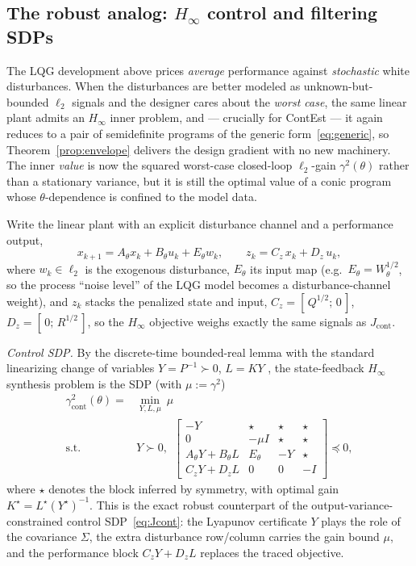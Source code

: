 \documentclass[twocolumn,amsthm]{autart}
\begin{document}
\subsection{The robust analog: $H_\infty$ control and filtering SDPs}
\label{sec:hinf}

The LQG development above prices \emph{average} performance against
\emph{stochastic} white disturbances. When the disturbances are better modeled as
unknown-but-bounded $\ell_2$ signals and the designer cares about the
\emph{worst case}, the same linear plant admits an $H_\infty$ inner problem, and
--- crucially for ContEst --- it again reduces to a pair of semidefinite programs
of the generic form~\eqref{eq:generic}, so Theorem~\ref{prop:envelope} delivers
the design gradient with no new machinery. The inner \emph{value} is now the
squared worst-case closed-loop $\ell_2$-gain $\gamma^2(\theta)$ rather than a
stationary variance, but it is still the optimal value of a conic program whose
$\theta$-dependence is confined to the model data.

Write the linear plant with an explicit disturbance channel and a performance
output,
\begin{equation}\label{eq:hinf_plant}
x_{k+1} = A_\theta x_k + B_\theta u_k + E_\theta w_k,\qquad
z_k = C_{z}\,x_k + D_{z}\,u_k,
\end{equation}
where $w_k\in\ell_2$ is the exogenous disturbance, $E_\theta$ its input map
(e.g.\ $E_\theta = W_\theta^{1/2}$, so the process ``noise level'' of the LQG model
becomes a disturbance-channel weight), and $z_k$ stacks the penalized
state and input, $C_z = [\,Q^{1/2};\,0\,]$, $D_z = [\,0;\,R^{1/2}\,]$, so the
$H_\infty$ objective weighs exactly the same signals as $J_{\mathrm{cont}}$.

\emph{Control SDP.} By the discrete-time bounded-real lemma with the standard
linearizing change of variables $Y = P^{-1}\succ 0$, $L = KY$
\cite{boyd1994linear,grigoriadis1998integrate}, the state-feedback $H_\infty$
synthesis problem is the SDP (with $\mu := \gamma^2$)
\begin{equation}\label{eq:Hinf_cont}
\begin{aligned}
\gamma^2_{\mathrm{cont}}(\theta) = &\min_{Y,L,\mu}\ \mu \\
\text{s.t. } & Y \succ 0,\ \
\begin{bmatrix}
-Y & \star & \star & \star \\
0 & -\mu I & \star & \star \\
A_\theta Y + B_\theta L & E_\theta & -Y & \star \\
C_z Y + D_z L & 0 & 0 & -I
\end{bmatrix} \preceq 0,
\end{aligned}
\end{equation}
where $\star$ denotes the block inferred by symmetry, with optimal gain
$K^\star = L^\star (Y^\star)^{-1}$. This is the exact robust
counterpart of the output-variance-constrained control SDP~\eqref{eq:Jcont}: the
Lyapunov certificate $Y$ plays the role of the covariance $\Sigma$, the extra
disturbance row/column carries the gain bound $\mu$, and the performance block
$C_zY+D_zL$ replaces the traced objective.
\end{document}
